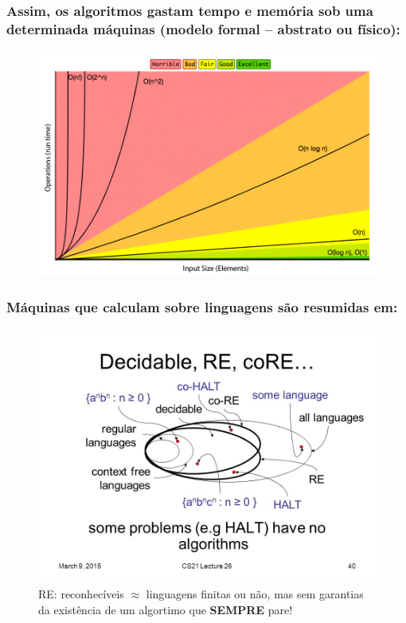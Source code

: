 \documentclass[10pt]{beamer}
\begin{document}


\begin{frame}[fragile]

\frametitle{Assim, os   algoritmos  gastam tempo e memória sob uma determinada máquinas (modelo formal -- abstrato ou físico):}

\begin{figure}[!ht]
	\centering
	\includegraphics[height =.65\textheight,width=.8\textwidth]
	{figuras/complexidade_algo.png}
\end{figure}

\end{frame}


\begin{frame}[fragile]

\frametitle{Máquinas que calculam sobre linguagens são resumidas em:}

\begin{figure}[!ht]
\centering
\includegraphics[height =.65\textheight,width=.85\textwidth]
{figuras/some+problems+have+no+algorithms_HALT.jpg}
\caption{RE: reconhecíveis $\approx $ linguagens finitas ou não, mas sem garantias da existência de um algortimo que \textbf{SEMPRE} pare!}
\end{figure}

\end{frame}
\end{document}
